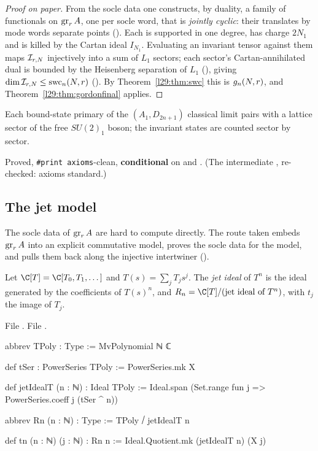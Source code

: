 \begin{proof}[Proof on paper]
From the socle data one constructs, by duality, a family of functionals on $\operatorname{gr}_rA$, one per socle word,
that is \emph{jointly cyclic}: their translates by mode words separate points (). Each is
supported in one degree, has charge $2N_1$ and is killed by the Cartan ideal $I_{N_1}$. Evaluating an invariant tensor
against them maps $\mathcal I_{r,N}$ injectively into a sum of $L_1$ sectors; each sector's Cartan-annihilated
dual is bounded by the Heisenberg separation of $L_1$ (), giving
$\dim\mathcal I_{r,N}\le\mathrm{swc}_n(N,r)$ (). By
Theorem~\ref{l29:thm:swc} this is $g_n(N,r)$, and Theorem~\ref{l29:thm:gordonfinal} applies.
\end{proof}

\begin{physics}
Each bound-state primary of the $(A_1,D_{2n+1})$ classical limit pairs with a lattice sector of the free $SU(2)_1$
boson; the invariant states are counted sector by sector.
\end{physics}

\begin{status}
Proved, \texttt{\#print axioms}-clean, \textbf{conditional} on  and . (The intermediate
, re-checked: axioms standard.)
\end{status}

\subsection{The jet model}

The socle data of $\operatorname{gr}_rA$ are hard to compute directly. The route taken embeds $\operatorname{gr}_rA$ into an
explicit commutative model, proves the socle data for the model, and pulls them back along the injective intertwiner
().

\begin{definition}\label{l29:def:Rn}
Let $\C[T]=\C[T_0,T_1,\dots]$ and $T(s)=\sum_jT_js^j$. The \emph{jet ideal} of $T^n$ is the ideal generated by the
coefficients of $T(s)^n$, and $\ltwentynineRn=\C[T]/(\text{jet ideal of }T^n)$, with $t_j$ the image of $T_j$.
\end{definition}

\noindent File .
\noindent File .
\begin{leancode}
abbrev TPoly : Type := MvPolynomial ℕ ℂ

def tSer : PowerSeries TPoly := PowerSeries.mk X

def jetIdealT (n : ℕ) : Ideal TPoly :=
  Ideal.span (Set.range fun j => PowerSeries.coeff j (tSer ^ n))

abbrev Rn (n : ℕ) : Type := TPoly ⧸ jetIdealT n

def tn (n : ℕ) (j : ℕ) : Rn n := Ideal.Quotient.mk (jetIdealT n) (X j)
\end{leancode}

